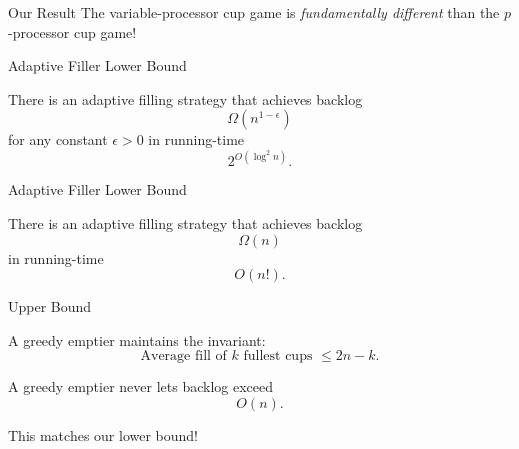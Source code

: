 \documentclass[xcolor=x11names, svgnames, rgb]{beamer}
\begin{document}
\begin{frame}[c]{Our Result}
  The variable-processor cup game is \emph{fundamentally different} than the $p$-processor cup game!
\end{frame}

\begin{frame}[t]{Adaptive Filler Lower Bound}
  \begin{theorem}
    There is an adaptive filling strategy that achieves
    backlog $$\Omega(n^{1-\epsilon})$$ for any constant $\epsilon >0$ in running-time $$2^{O(\log^2 n)}.$$
  \end{theorem}
\end{frame}
\begin{frame}[t]{Adaptive Filler Lower Bound}
  \begin{theorem}
    There is an adaptive filling strategy that achieves backlog $$\Omega(n)$$ in running-time $$O(n!).$$
  \end{theorem}
\end{frame}
\begin{frame}[t]{Upper Bound}
  \begin{theorem}
    A greedy emptier maintains the invariant: 
    $$\text{Average fill of $k$ fullest cups } \le 2n-k.$$
  \end{theorem}

  \begin{corollary}
  A greedy emptier never lets backlog exceed $$O(n).$$
  \end{corollary}

  \vspace{0.3cm}
  This matches our lower bound!
\end{frame}
\end{document}
